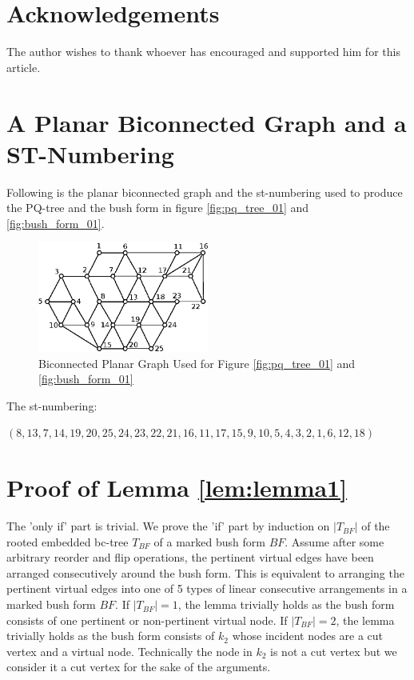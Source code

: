 \documentclass[a4]{jgaa-art}
\begin{document}
\section{Acknowledgements}
The author wishes to thank whoever has encouraged and supported him for this article.

\clearpage




\clearpage

\begin{appendices}
\section{A Planar Biconnected Graph and a ST-Numbering}\label{App:AppendixA}
Following is the planar biconnected graph and the 
st-numbering used to produce the PQ-tree and the bush form in figure 
 \ref{fig:pq_tree_01} and \ref{fig:bush_form_01}.

\begin{figure}[!htb]
  \centering
  \includegraphics[width=0.5\textwidth]{sample_graph}
  \caption{Biconnected Planar Graph Used for Figure \ref{fig:pq_tree_01} and \ref{fig:bush_form_01}}
  \label{fig:sample_graph}
\end{figure}

The st-numbering:

$(8, 13, 7, 14, 19, 20, 25, 24, 23, 22, 21, 16, 11, 17, 15, 9, 10, 5, 4, 3, 2, 1, 6, 12, 18)$


\section{Proof of Lemma \ref{lem:lemma1}}\label{App:AppendixB}


The 'only if' part is trivial.  We prove the 'if' part by induction on
 $|T_{BF}|$
of the rooted embedded bc-tree $T_{BF}$ of a marked bush form $BF$.
Assume after some arbitrary reorder and flip operations, the pertinent virtual edges have been arranged
consecutively around the bush form.
This is equivalent to arranging the pertinent virtual edges into one of 5 types of 
linear consecutive arrangements in a marked bush form $BF$.
If $|T_{BF}| = 1$, the lemma trivially holds as the bush form consists of one pertinent or non-pertinent virtual node.
If $|T_{BF}| = 2$, the lemma trivially holds as the bush form consists of $k_2$ whose incident nodes are a cut vertex and a virtual node. Technically the node in $k_2$ is not a cut vertex but we consider it a cut vertex for the sake of the arguments.



\end{appendices}
\end{document}

